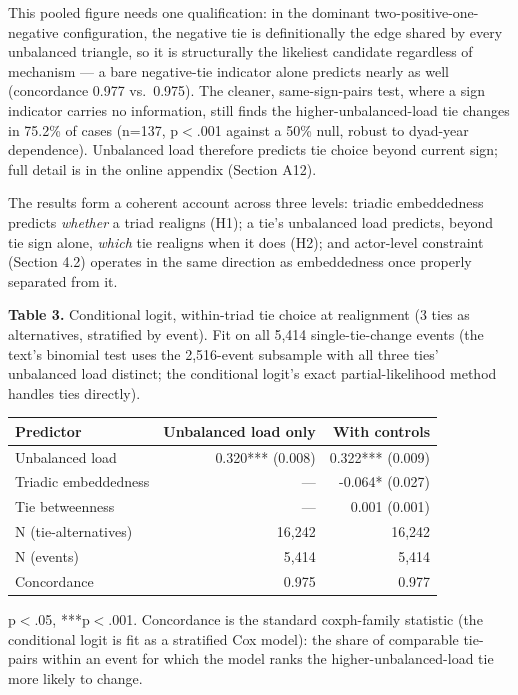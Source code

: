 \documentclass[Afour,sageh,times,doublespace]{sagej}
\begin{document}
This pooled figure needs one qualification: in the dominant two-positive-one-negative configuration, the negative tie is definitionally the edge shared by every unbalanced triangle, so it is structurally the likeliest candidate regardless of mechanism --- a bare negative-tie indicator alone predicts nearly as well (concordance 0.977 vs.\ 0.975). The cleaner, same-sign-pairs test, where a sign indicator carries no information, still finds the higher-unbalanced-load tie changes in 75.2\% of cases (n=137, p$<$.001 against a 50\% null, robust to dyad-year dependence). Unbalanced load therefore predicts tie choice beyond current sign; full detail is in the online appendix (Section A12).

The results form a coherent account across three levels: triadic embeddedness predicts \emph{whether} a triad realigns (H1); a tie's unbalanced load predicts, beyond tie sign alone, \emph{which} tie realigns when it does (H2); and actor-level constraint (Section 4.2) operates in the same direction as embeddedness once properly separated from it.

\begin{table}[t]
\centering
\textbf{Table 3.} Conditional logit, within-triad tie choice at realignment (3 ties as alternatives, stratified by event). Fit on all 5,414 single-tie-change events (the text's binomial test uses the 2,516-event subsample with all three ties' unbalanced load distinct; the conditional logit's exact partial-likelihood method handles ties directly).

\vspace{4pt}
{\small\sf
\begin{tabular}{lrr}
\toprule
Predictor & Unbalanced load only & With controls\\
\midrule
Unbalanced load & 0.320*** (0.008) & 0.322*** (0.009)\\
Triadic embeddedness & --- & -0.064* (0.027)\\
Tie betweenness & --- & 0.001 (0.001)\\
N (tie-alternatives) & 16,242 & 16,242\\
N (events) & 5,414 & 5,414\\
Concordance & 0.975 & 0.977\\
\bottomrule
\end{tabular}
\par}

\vspace{4pt}
{\small *p$<$.05, ***p$<$.001. Concordance is the standard coxph-family statistic (the conditional logit is fit as a stratified Cox model): the share of comparable tie-pairs within an event for which the model ranks the higher-unbalanced-load tie more likely to change.}
\end{table}
\end{document}
